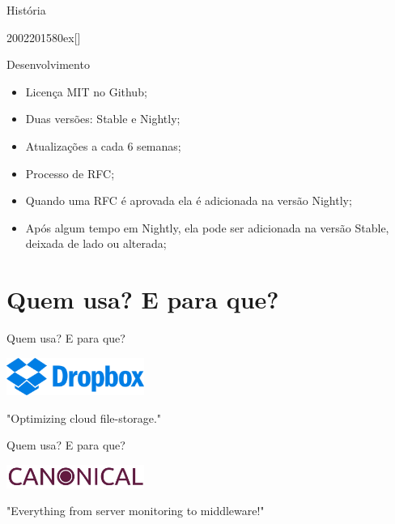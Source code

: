 \documentclass[aspectratio=169]{beamer}
\begin{document}
\begin{frame}{História}
	\begin{chronology}[5]{2002}{2015}{80ex}[\textwidth]
	\end{chronology}
\end{frame}

\begin{frame}{Desenvolvimento}
	\begin{itemize}
		\item Licença MIT no Github;
		\item Duas versões: Stable e Nightly;
		\item Atualizações a cada 6 semanas;
		\item Processo de RFC;
		\item Quando uma RFC é aprovada ela é adicionada na versão Nightly;
		\item Após algum tempo em Nightly, ela pode ser adicionada na versão Stable, deixada de lado ou alterada;	
	\end{itemize}
\end{frame}

\section{Quem usa? E para que?}

\begin{frame}{Quem usa? E para que?}
	\begin{center}
		\includegraphics[width=4.5cm]{imgs/dropbox.png}	
		
		"Optimizing cloud file-storage."
	\end{center}
\end{frame}

\begin{frame}{Quem usa? E para que?}
	\begin{center}
		\includegraphics[width=4.5cm]{imgs/canonical.jpeg}	
		
		"Everything from server monitoring to middleware!"
	\end{center}
\end{frame}
\end{document}
